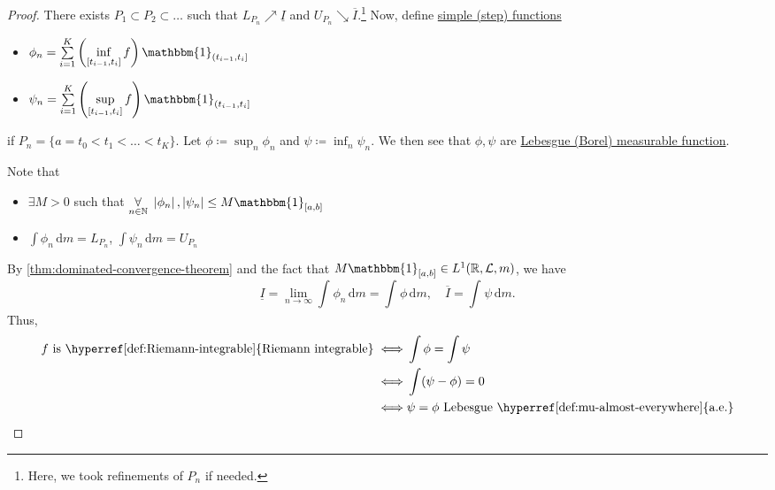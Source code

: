 \begin{proof}
	There exists \(P_1\subset P_2\subset \ldots  \) such that \(L_{P_{n}}\nearrow \underline{I} \) and \(U_{P_{n}}\searrow \overline{I} \).\footnote{Here, we took refinements of \(P_{n}\) if needed.}
	Now, define \hyperref[def:simple-function]{simple (step) functions}
	\begin{itemize}
		\item \(\phi _{n} = \sum\limits_{i=1}^{K} \left(\inf\limits_{[t_{i-1}, t_{i}]} f \right) \mathbbm{1}_{(t_{i-1}, t_{i}]} \)
		\item \(\psi _{n} = \sum\limits_{i=1}^{K} \left(\sup\limits_{[t_{i-1}, t_{i}]} f \right) \mathbbm{1}_{(t_{i-1}, t_{i}]} \)
	\end{itemize}
	if \(P_{n} = \{a = t_0 < t_1 < \ldots < t_{K} \}\). Let \(\phi \coloneqq \sup_n \phi _{n}\) and \(\psi \coloneqq \inf _n \psi _{n}\).
	We then see that \(\phi , \psi \) are \hyperref[def:measurable-function]{Lebesgue (Borel) measurable function}.
	\begin{note}
		Note that
		\begin{itemize}
			\item \(\exists M> 0\) such that \(\underset{n\in\mathbb{\MakeUppercase{n}} }{\forall }\ \left\vert \phi _{n} \right\vert, \left\vert \psi _{n} \right\vert \leq M\mathbbm{1}_{[a, b]} \)
			\item \(\int \phi _{n}\,\mathrm{d}m = L_{P_{n}}\), \(\int \psi _{n}\,\mathrm{d}m = U_{P_{n}}\)
		\end{itemize}
	\end{note}
	By \autoref{thm:dominated-convergence-theorem} and the fact that \(M\mathbbm{1}_{[a, b]} \in L^1(\mathbb{\MakeUppercase{r}} , \mathcal{\MakeUppercase{l}} , m) \),
	we have
	\[
		\underline{I} = \lim\limits_{n \to \infty} \int_{}^{} \phi _{n} \,\mathrm{d}m = \int_{}^{} \phi  \,\mathrm{d}m,\quad \overline{I}  = \int_{}^{} \psi  \,\mathrm{d}m.
	\]
	Thus,
	\[
		\begin{split}
			f \text{ is \hyperref[def:Riemann-integrable]{Riemann integrable}}
			\iff  &\int \phi = \int \psi\\
			\iff  &\int (\psi - \phi ) = 0\\
			\iff  &\psi = \phi \text{ Lebesgue \hyperref[def:mu-almost-everywhere]{a.e.}}
		\end{split}
	\]

\end{proof}

